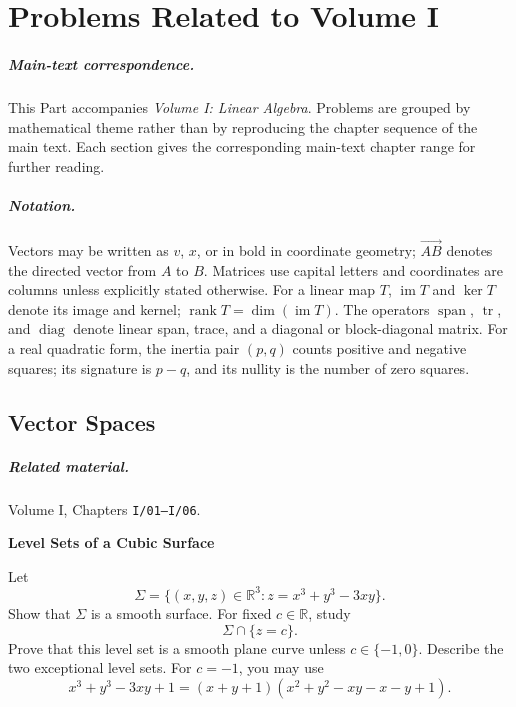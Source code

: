 \chapter{Problems Related to Volume I}
\label{ch:companion-i}

\paragraph{Main-text correspondence.}
This Part accompanies \emph{Volume I: Linear Algebra}. Problems are grouped by
mathematical theme rather than by reproducing the chapter sequence of the main text.
Each section gives the corresponding main-text chapter range for further reading.

\paragraph{Notation.}
Vectors may be written as \(v\), \(x\), or in bold in coordinate geometry;
\(\overrightarrow{AB}\) denotes the directed vector from \(A\) to \(B\).
Matrices use capital letters and coordinates are columns unless explicitly stated otherwise.
For a linear map \(T\), \(\operatorname{im}T\) and \(\ker T\) denote its image and kernel;
\(\operatorname{rank}T=\dim(\operatorname{im}T)\).
The operators \(\operatorname{span}\), \(\operatorname{tr}\), and \(\operatorname{diag}\)
denote linear span, trace, and a diagonal or block-diagonal matrix.
For a real quadratic form, the inertia pair \((p,q)\) counts positive and negative squares;
its signature is \(p-q\), and its nullity is the number of zero squares.

\section{Vector Spaces}

\paragraph{Related material.} Volume I, Chapters \texttt{I/01--I/06}.

\begin{problem}[CP-I-0002]
\label{prob:cp-i-0002}
\textbf{Level Sets of a Cubic Surface}

\hspace*{1.5em}Let
\[
\Sigma=\{(x,y,z)\in\mathbb R^3:z=x^3+y^3-3xy\}.
\]
Show that \(\Sigma\) is a smooth surface. For fixed \(c\in\mathbb R\), study
\[
\Sigma\cap\{z=c\}.
\]
Prove that this level set is a smooth plane curve unless \(c\in\{-1,0\}\). Describe the two
exceptional level sets. For \(c=-1\), you may use
\[
x^3+y^3-3xy+1
=
(x+y+1)(x^2+y^2-xy-x-y+1).
\]
\end{problem}

